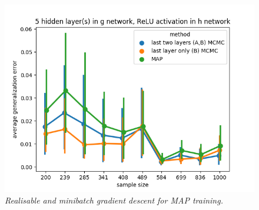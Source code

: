 \documentclass{article} %
\begin{document}
\begin{figure}[t!]
\begin{center}
		\includegraphics[scale=0.35]{taskid15.png}
	\end{center}
	\caption{\textit{Realisable and minibatch gradient descent for MAP training.}}
	\label{fig:avg_gen_err_minibatch_realisable}
\end{figure}


\begin{table}[h!]%
	\centering

	\caption{Companion to Figure \ref{fig:avg_gen_err_minibatch_realisable}.}%
	\label{table::avg_gen_err_minibatch_realisable}%
	\begin{tiny}
	\begin{subtable}[t]{2.5in}

		\caption{1 hidden layer(s) in $g$, identity activation in $h$}
		
	\end{subtable}
	\quad
	\begin{subtable}[t]{2.5in}
		\caption{5 hidden layer(s) in $g$, identity activation in $h$}
		
	\end{subtable}
	\quad 
	\begin{subtable}[t]{2.5in}
		\caption{1 hidden layer(s) in $g$, ReLU activation in $h$}
		
	\end{subtable}
	\quad
	\begin{subtable}[t]{2.5in}
		\caption{5 hidden layer(s) in $g$, ReLU activation in $h$}
		
	\end{subtable}
	\end{tiny}
\end{table}
\end{document}
